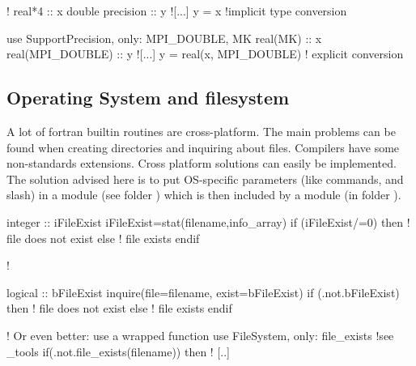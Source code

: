 \documentclass{article}
\begin{document}
\begin{codea}
!
real*4           :: x
double precision :: y
![...]
y = x  !implicit type conversion
\end{codea} 
\begin{codeb}
use SupportPrecision, only: MPI_DOUBLE, MK
real(MK)         :: x
real(MPI_DOUBLE) :: y
![...]
y = real(x, MPI_DOUBLE) ! explicit conversion 
\end{codeb}

\subsection{Operating System and filesystem}
\label{sec:os}
A lot of fortran builtin routines are cross-platform. 
The main problems can be found when creating directories and inquiring about files.
Compilers have some non-standards extensions. Cross platform solutions can easily be implemented.
The solution advised here is to put OS-specific parameters (like commands, and slash) in a module  (see folder ) which is then included by a  module (in folder ).



\begin{codea}
integer :: iFileExist
iFileExist=stat(filename,info_array)
if (iFileExist/=0) then
 ! file does not exist
else
  ! file exists
endif




!
\end{codea} 
\begin{codeb}
logical :: bFileExist
inquire(file=filename, exist=bFileExist)
if (.not.bFileExist) then
 ! file does not exist
else
  ! file exists
endif
 
! Or even better: use a wrapped function
use FileSystem, only: file_exists !see  _tools
if(.not.file_exists(filename)) then
! [..]

\end{codeb}
\end{document}
